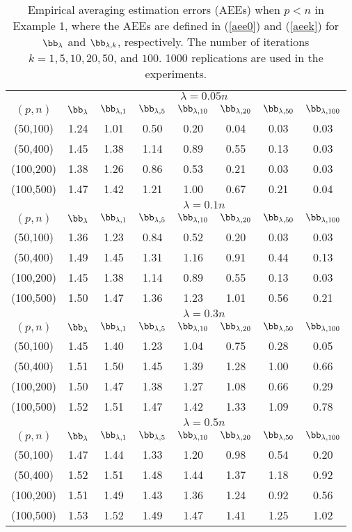 \begin{table}[htp]
\caption{Empirical averaging estimation errors (AEEs) when $p<n$ in Example 1, where the AEEs are defined in (\ref{aee0}) and (\ref{aeek}) for $\bb_{\lambda}$ and $\bb_{\lambda,k}$, respectively. The number of iterations $k=1,5,10,20,50$, and $100$. 1000 replications are used in the experiments.} 
          \label{Table-a2}
{\begin{center}
\begin{tabular}{cccccccc}
\toprule
&\multicolumn{7}{c}{$\lambda=0.05n$}\\
\cline{2-8}
$(p,n)$&$\bb_{\lambda}$&$\bb_{\lambda,1}$&$\bb_{\lambda,5}$&$\bb_{\lambda,10}$&$\bb_{\lambda,20}$&$\bb_{\lambda,50}$&$\bb_{\lambda,100}$\\
\hline
(50,100)&1.24&1.01&0.50&0.20&0.04&0.03&0.03\\
(50,400)&1.45&1.38&1.14&0.89&0.55&0.13&0.03\\
(100,200)&1.38&1.26&0.86&0.53&0.21&0.03&0.03\\
(100,500)&1.47&1.42&1.21&1.00&0.67&0.21&0.04\\
\midrule
&\multicolumn{7}{c}{$\lambda=0.1n$}\\
\cline{2-8}
$(p,n)$&$\bb_{\lambda}$&$\bb_{\lambda,1}$&$\bb_{\lambda,5}$&$\bb_{\lambda,10}$&$\bb_{\lambda,20}$&$\bb_{\lambda,50}$&$\bb_{\lambda,100}$\\
\hline
(50,100)&1.36&1.23&0.84&0.52&0.20&0.03&0.03\\
(50,400)&1.49&1.45&1.31&1.16&0.91&0.44&0.13\\
(100,200)&1.45&1.38&1.14&0.89&0.55&0.13&0.03\\
(100,500)&1.50&1.47&1.36&1.23&1.01&0.56&0.21\\
\midrule
&\multicolumn{7}{c}{$\lambda=0.3n$}\\
\cline{2-8}
$(p,n)$&$\bb_{\lambda}$&$\bb_{\lambda,1}$&$\bb_{\lambda,5}$&$\bb_{\lambda,10}$&$\bb_{\lambda,20}$&$\bb_{\lambda,50}$&$\bb_{\lambda,100}$\\
\hline
(50,100)&1.45&1.40&1.23&1.04&0.75&0.28&0.05\\
(50,400)&1.51&1.50&1.45&1.39&1.28&1.00&0.66\\
(100,200)&1.50&1.47&1.38&1.27&1.08&0.66&0.29\\
(100,500)&1.52&1.51&1.47&1.42&1.33&1.09&0.78\\
\midrule
&\multicolumn{7}{c}{$\lambda=0.5n$}\\
\cline{2-8}
$(p,n)$&$\bb_{\lambda}$&$\bb_{\lambda,1}$&$\bb_{\lambda,5}$&$\bb_{\lambda,10}$&$\bb_{\lambda,20}$&$\bb_{\lambda,50}$&$\bb_{\lambda,100}$\\
\hline
(50,100)&1.47&1.44&1.33&1.20&0.98&0.54&0.20\\
(50,400)&1.52&1.51&1.48&1.44&1.37&1.18&0.92\\
(100,200)&1.51&1.49&1.43&1.36&1.24&0.92&0.56\\
(100,500)&1.53&1.52&1.49&1.47&1.41&1.25&1.02\\
\bottomrule
\end{tabular}
  \end{center}}
\end{table}

